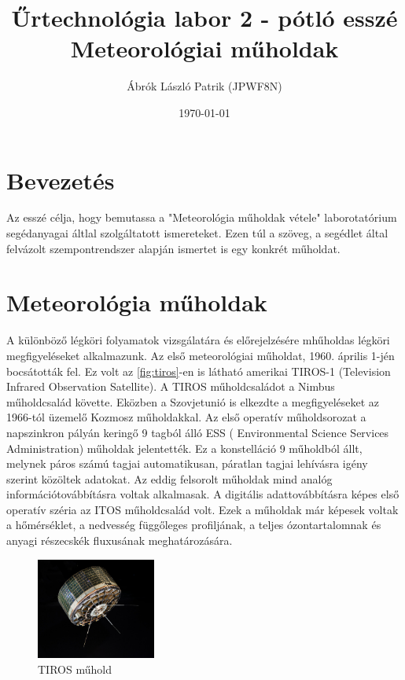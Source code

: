 \documentclass[a4paper,11pt]{article}
\title{ \small Űrtechnológia labor 2 - pótló esszé \\ \LARGE Meteorológiai műholdak}
\author{Ábrók László Patrik (JPWF8N)}
\date{\today}
\begin{document}

\maketitle

\section*{Bevezetés}
Az esszé célja, hogy bemutassa a "Meteorológia műholdak vétele" laborotatórium segédanyagai áltlal szolgáltatott ismereteket. Ezen túl a szöveg, a segédlet által felvázolt szempontrendszer alapján ismertet is egy konkrét műholdat.

\section*{Meteorológia műholdak}
A különböző légköri folyamatok vizsgálatára és előrejelzésére mhűholdas légköri megfigyeléseket alkalmazunk. Az első meteorológiai műholdat, 1960. április 1-jén bocsátották fel.
Ez volt az \autoref{fig:tiros}-en is látható amerikai TIROS-1 (Television Infrared Observation Satellite). A TIROS műholdcsaládot a Nimbus műholdcsalád követte. Eközben a Szovjetunió is elkezdte a megfigyeléseket az 1966-tól üzemelő Kozmosz műholdakkal.
Az első operatív műholdsorozat a napszinkron pályán keringő 9 tagból álló ESS (    Environmental Science Services Administration) műholdak jelentették. Ez a konstelláció 9 műholdból állt, melynek páros számú tagjai automatikusan, páratlan tagjai lehívásra igény szerint közöltek adatokat.
Az eddig felsorolt műholdak mind analóg információtovábbításra voltak alkalmasak. A digitális adattovábbításra képes első operatív széria az ITOS műholdcsalád volt. Ezek a műholdak már képesek voltak a hőmérséklet, a nedvesség függőleges profiljának, a teljes ózontartalomnak
és anyagi részecskék fluxusának meghatározására.

\begin{figure}[H]
    \centering
    \includegraphics[width=0.35\textwidth]{../resources/tiros.jpg}
    \caption{TIROS műhold}
    \label{fig:tiros}
\end{figure}
\end{document}
